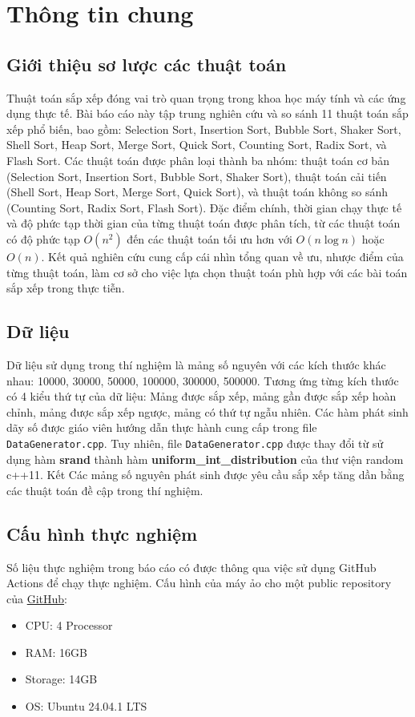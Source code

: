 \section{Thông tin chung}

\subsection{Giới thiệu sơ lược các thuật toán}

Thuật toán sắp xếp đóng vai trò quan trọng trong khoa học máy tính và các ứng dụng thực tế. Bài báo cáo này tập trung nghiên cứu và so sánh 11 thuật toán sắp xếp phổ biến, bao gồm: Selection Sort, Insertion Sort, Bubble Sort, Shaker Sort, Shell Sort, Heap Sort, Merge Sort, Quick Sort, Counting Sort, Radix Sort, và Flash Sort. Các thuật toán được phân loại thành ba nhóm: thuật toán cơ bản (Selection Sort, Insertion Sort, Bubble Sort, Shaker Sort), thuật toán cải tiến (Shell Sort, Heap Sort, Merge Sort, Quick Sort), và thuật toán không so sánh (Counting Sort, Radix Sort, Flash Sort). Đặc điểm chính, thời gian chạy thực tế và độ phức tạp thời gian của từng thuật toán được phân tích, từ các thuật toán có độ phức tạp $O(n^2)$ đến các thuật toán tối ưu hơn với $O(n \log n)$ hoặc $O(n)$. Kết quả nghiên cứu cung cấp cái nhìn tổng quan về ưu, nhược điểm của từng thuật toán, làm cơ sở cho việc lựa chọn thuật toán phù hợp với các bài toán sắp xếp trong thực tiễn.

\subsection{Dữ liệu}

Dữ liệu sử dụng trong thí nghiệm là mảng số nguyên với các kích thước khác nhau: 10000, 30000, 50000, 100000, 300000, 500000. Tương ứng từng kích thước có 4 kiểu thứ tự của dữ liệu: Mảng được sắp xếp, mảng gần được sắp xếp hoàn chỉnh, mảng được sắp xếp ngược, mảng có thứ tự ngẫu nhiên. Các hàm phát sinh dãy số được giáo viên hướng dẫn thực hành cung cấp trong file \texttt{DataGenerator.cpp}. Tuy nhiên, file \texttt{DataGenerator.cpp} được thay đổi từ sử dụng hàm \textbf{srand} thành hàm \textbf{uniform_int_distribution} của thư viện random c++11. Kết  Các mảng số nguyên phát sinh được yêu cầu sắp xếp tăng dần bằng các thuật toán đề cập trong thí nghiệm.

\subsection{Cấu hình thực nghiệm}
Số liệu thực nghiệm trong báo cáo có được thông qua việc sử dụng GitHub Actions để chạy thực nghiệm. Cấu hình của máy ảo cho một public repository của \href{https://docs.github.com/en/actions/using-github-hosted-runners/using-github-hosted-runners/about-github-hosted-runners#supported-runners-and-hardware-resources}{GitHub}:
\begin{itemize}
    \item CPU: 4 Processor
    \item RAM: 16GB
    \item Storage: 14GB
    \item OS: Ubuntu 24.04.1 LTS
\end{itemize}
 

 
